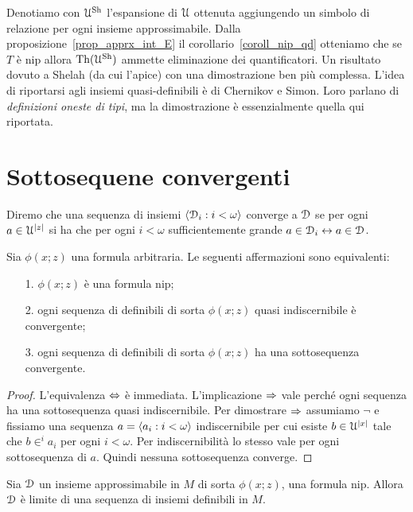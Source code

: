 Denotiamo con $\EuScript U^{\rm Sh}$ l'espansione di $\EuScript U$ ottenuta aggiungendo un simbolo di relazione per ogni insieme approssimabile. Dalla proposizione~\ref{prop_apprx_int_E} il corollario~\ref{coroll_nip_qd} otteniamo che se $T$ \`e nip allora $\textrm{Th}(\EuScript U^{\rm Sh})$ ammette eliminazione dei quantificatori. Un risultato dovuto a Shelah (da cui l'apice) con una dimostrazione ben pi\`u complessa. L'idea di riportarsi agli insiemi quasi-definibili \`e di Chernikov e Simon. Loro parlano di \textit{definizioni oneste di tipi}, ma la dimostrazione \`e essenzialmente quella qui riportata. 


\section{Sottosequene convergenti}

Diremo che una sequenza di insiemi $\langle\EuScript D_i:i<\omega\rangle$ converge a $\EuScript D$ se per ogni $a\in\EuScript U^{|z|}$ si ha che per ogni $i<\omega$ sufficientemente grande $a\in\EuScript D_i\leftrightarrow a\in\EuScript D$. 

\begin{proposition} 
Sia $\phi(x;z)$ una formula arbitraria. Le seguenti affermazioni sono equivalenti:
\begin{itemize}
\item[1.] $\phi(x;z)$ \`e una formula nip;
\item[2.] ogni sequenza di definibili di sorta $\phi(x;z)$ quasi indiscernibile \`e convergente;
\item[3.] ogni sequenza di definibili di sorta $\phi(x;z)$ ha una sottosequenza convergente.
\end{itemize} 
\end{proposition}

\begin{proof}
L'equivalenza $\Leftrightarrow$ \`e immediata. L'implicazione $\Rightarrow$ vale perch\'e ogni sequenza ha una sottosequenza quasi indiscernibile. Per dimostrare $\Rightarrow$ assumiamo $\neg$ e fissiamo una sequenza $a=\langle a_i:i<\omega\rangle$ indiscernibile per cui esiste $b\in\EuScript U^{|x|}$ tale che $b\in^i\!a_i$ per ogni $i<\omega$. Per indiscernibilit\`a lo stesso vale per ogni sottosequenza di $a$. Quindi nessuna sottosequenza converge.
\end{proof}



\begin{proposition}[?]
Sia $\EuScript D$ un insieme approssimabile in $M$ di sorta $\phi(x;z)$, una formula nip. Allora $\EuScript D$ \`e limite di una sequenza di insiemi definibili in $M$.
\end{proposition}



